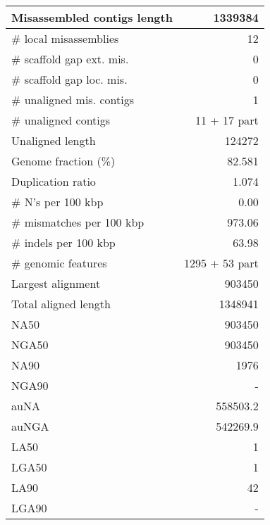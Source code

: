 \documentclass[12pt,a4paper]{article}
\begin{document}
\begin{table}[ht]
\begin{center}
\begin{tabular}{|l*{1}{|r}|}
Misassembled contigs length & 1339384 \\ \hline
\# local misassemblies & 12 \\ \hline
\# scaffold gap ext. mis. & 0 \\ \hline
\# scaffold gap loc. mis. & 0 \\ \hline
\# unaligned mis. contigs & 1 \\ \hline
\# unaligned contigs & 11 + 17 part \\ \hline
Unaligned length & 124272 \\ \hline
Genome fraction (\%) & 82.581 \\ \hline
Duplication ratio & 1.074 \\ \hline
\# N's per 100 kbp & 0.00 \\ \hline
\# mismatches per 100 kbp & 973.06 \\ \hline
\# indels per 100 kbp & 63.98 \\ \hline
\# genomic features & 1295 + 53 part \\ \hline
Largest alignment & 903450 \\ \hline
Total aligned length & 1348941 \\ \hline
NA50 & 903450 \\ \hline
NGA50 & 903450 \\ \hline
NA90 & 1976 \\ \hline
NGA90 & - \\ \hline
auNA & 558503.2 \\ \hline
auNGA & 542269.9 \\ \hline
LA50 & 1 \\ \hline
LGA50 & 1 \\ \hline
LA90 & 42 \\ \hline
LGA90 & - \\ \hline
\end{tabular}
\end{center}
\end{table}
\end{document}
